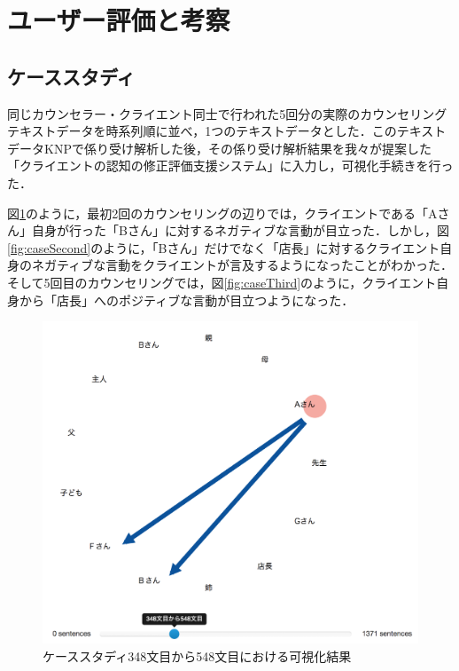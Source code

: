 \documentclass[shuuron]{kuee}
\begin{document}
\section{ユーザー評価と考察}

\subsection{ケーススタディ}

同じカウンセラー・クライエント同士で行われた5回分の実際のカウンセリングテキストデータを時系列順に並べ，1つのテキストデータとした．このテキストデータKNPで係り受け解析した後，その係り受け解析結果を我々が提案した「クライエントの認知の修正評価支援システム」に入力し，可視化手続きを行った．

図\ref{fig:caseFirst}のように，最初2回のカウンセリングの辺りでは，クライエントである「Aさん」自身が行った「Bさん」に対するネガティブな言動が目立った．しかし，図\ref{fig:caseSecond}のように，「Bさん」だけでなく「店長」に対するクライエント自身のネガティブな言動をクライエントが言及するようになったことがわかった．そして5回目のカウンセリングでは，図\ref{fig:caseThird}のように，クライエント自身から「店長」へのポジティブな言動が目立つようになった．


\begin{figure}
  \begin{center}
    \includegraphics[width=\linewidth]{caseFirst.png}
  \end{center}
  \caption{ケーススタディ348文目から548文目における可視化結果}
  \label{fig:caseFirst}
\end{figure}
\end{document}

